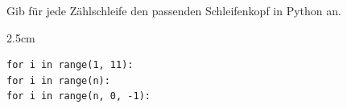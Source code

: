\question[3]
Gib für jede Zählschleife den passenden Schleifenkopf in Python an.
\begin{solutionbox}{2.5cm}
\begin{lstlisting}
for i in range(1, 11):
for i in range(n):
for i in range(n, 0, -1):
\end{lstlisting}
\end{solutionbox}
